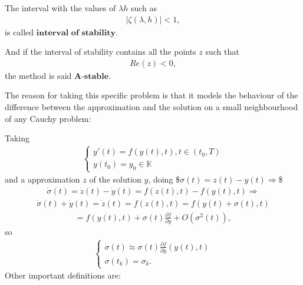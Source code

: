 \documentclass[letterpaper,10pt,english]{jupyterBook}
\begin{document}
\sphinxAtStartPar
The interval with the values of \(\lambda h\) such as
\begin{equation*}
\begin{split}
|\zeta(\lambda, h)|<1,
\end{split}
\end{equation*}
\sphinxAtStartPar
is called \(\textbf{interval of stability}\).

\sphinxAtStartPar
And if the interval of stability contains all the points \(z\) such that
\begin{equation*}
\begin{split}
    Re(z) < 0,
\end{split}
\end{equation*}
\sphinxAtStartPar
the method is said \(\textbf{A-stable}\).

\sphinxAtStartPar
The reason for taking this specific problem is that it models the behaviour of the difference between the approximation and the solution on a small neighbourhood of any Cauchy problem:

\sphinxAtStartPar
Taking
\begin{equation*}
\begin{split}
\begin{cases}
    y'(t) = f(y(t), t), t \in (t_0, T) \\
    y(t_0) = y_0 \in \mathbb{K}
\end{cases}
\end{split}
\end{equation*}
\sphinxAtStartPar
and a approximation \(z\) of the solution \(y\), doing
\$\(
\sigma(t) = z(t) - y(t) \Rightarrow
\)\$
\begin{equation*}
\begin{split}
\dot{\sigma}(t) = \dot{z}(t) - \dot{y}(t) = f(z(t), t) - f(y(t), t) \Rightarrow
\end{split}
\end{equation*}\begin{equation*}
\begin{split}
\dot{\sigma}(t) + \dot{y}(t) = \dot{z}(t) = f(z(t), t) = f(y(t)+\sigma(t), t)
\end{split}
\end{equation*}\begin{equation*}
\begin{split}
 = f(y(t), t) + \sigma(t)\frac{\partial f}{\partial y} + O(\sigma^2(t)),
\end{split}
\end{equation*}
\sphinxAtStartPar
so
\begin{equation*}
\begin{split}
\begin{cases}
    \dot{\sigma}(t) \approx \sigma(t) \frac{\partial f}{\partial y} (y(t), t) \\
    \sigma(t_k) = \sigma_k.
\end{cases}
\end{split}
\end{equation*}
\sphinxAtStartPar
Other important definitions are:
\end{document}
